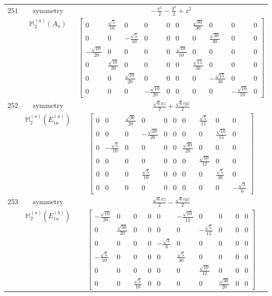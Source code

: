 \documentclass[fleqn,8pt,landscape]{jsarticle}
\begin{document}
\begin{longtable}{ccc}
$ 251 $ & $ \text{symmetry} $ & $ - \frac{x^{2}}{2} - \frac{y^{2}}{2} + z^{2} $ \\
$  $ & $ \mathbb{M}_{2}^{(a)}(A_{u}) $ & $ \begin{bmatrix} 0 & \frac{\sqrt{5}}{10} & 0 & 0 & 0 & 0 & \frac{\sqrt{30}}{30} & 0 & 0 & 0 \\ 0 & 0 & - \frac{\sqrt{5}}{10} & 0 & 0 & 0 & 0 & \frac{\sqrt{30}}{30} & 0 & 0 \\ - \frac{\sqrt{10}}{20} & 0 & 0 & 0 & 0 & \frac{\sqrt{10}}{10} & 0 & 0 & 0 & 0 \\ 0 & \frac{\sqrt{10}}{20} & 0 & 0 & 0 & 0 & \frac{\sqrt{15}}{30} & 0 & 0 & 0 \\ 0 & 0 & \frac{\sqrt{10}}{20} & 0 & 0 & 0 & 0 & - \frac{\sqrt{15}}{30} & 0 & 0 \\ 0 & 0 & 0 & - \frac{\sqrt{10}}{20} & 0 & 0 & 0 & 0 & - \frac{\sqrt{10}}{10} & 0 \end{bmatrix} $ \\ \hline
$ 252 $ & $ \text{symmetry} $ & $ \frac{\sqrt{6} x z}{2} + \frac{\sqrt{6} i y z}{2} $ \\
$  $ & $ \mathbb{M}_{2}^{(a)}(E_{1u}^{(a)}) $ & $ \begin{bmatrix} 0 & 0 & \frac{\sqrt{30}}{20} & 0 & 0 & 0 & 0 & \frac{\sqrt{5}}{15} & 0 & 0 \\ 0 & 0 & 0 & - \frac{\sqrt{10}}{20} & 0 & 0 & 0 & 0 & \frac{\sqrt{10}}{15} & 0 \\ 0 & - \frac{\sqrt{5}}{10} & 0 & 0 & 0 & 0 & \frac{\sqrt{30}}{20} & 0 & 0 & 0 \\ 0 & 0 & 0 & 0 & 0 & 0 & 0 & \frac{\sqrt{10}}{12} & 0 & 0 \\ 0 & 0 & 0 & \frac{\sqrt{5}}{10} & 0 & 0 & 0 & 0 & \frac{\sqrt{5}}{30} & 0 \\ 0 & 0 & 0 & 0 & 0 & 0 & 0 & 0 & 0 & - \frac{\sqrt{3}}{6} \end{bmatrix} $ \\ \hline
$ 253 $ & $ \text{symmetry} $ & $ \frac{\sqrt{6} x z}{2} - \frac{\sqrt{6} i y z}{2} $ \\
$  $ & $ \mathbb{M}_{2}^{(a)}(E_{1u}^{(b)}) $ & $ \begin{bmatrix} - \frac{\sqrt{10}}{20} & 0 & 0 & 0 & 0 & - \frac{\sqrt{10}}{15} & 0 & 0 & 0 & 0 \\ 0 & \frac{\sqrt{30}}{20} & 0 & 0 & 0 & 0 & - \frac{\sqrt{5}}{15} & 0 & 0 & 0 \\ 0 & 0 & 0 & 0 & - \frac{\sqrt{3}}{6} & 0 & 0 & 0 & 0 & 0 \\ - \frac{\sqrt{5}}{10} & 0 & 0 & 0 & 0 & \frac{\sqrt{5}}{30} & 0 & 0 & 0 & 0 \\ 0 & 0 & 0 & 0 & 0 & 0 & \frac{\sqrt{10}}{12} & 0 & 0 & 0 \\ 0 & 0 & \frac{\sqrt{5}}{10} & 0 & 0 & 0 & 0 & \frac{\sqrt{30}}{20} & 0 & 0 \end{bmatrix} $ \\ \hline

\end{longtable}
\end{document}
